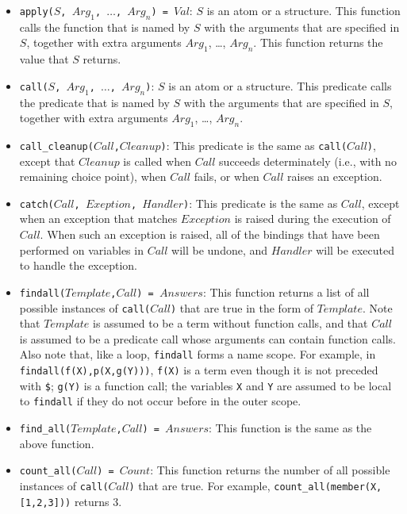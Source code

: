 \begin{itemize}
\item \texttt{apply($S$, $Arg_1$, $\ldots$, $Arg_n$) = $Val$}:   $S$ is an atom or a structure.  This function calls the function that is named by $S$ with the arguments that are specified in $S$, together with extra arguments $Arg_1$, \ldots, $Arg_n$.  This function returns the value that $S$ returns.
\item \texttt{call($S$, $Arg_1$, $\ldots$, $Arg_n$)}:  $S$ is an atom or a structure.  This predicate calls the predicate that is named by $S$ with the arguments that are specified in $S$, together with extra arguments $Arg_1$, \ldots, $Arg_n$.
\item \texttt{call\_cleanup($Call$,$Cleanup$)}: This predicate is the same as \texttt{call($Call$)}, except that \texttt{$Cleanup$} is called when \texttt{$Call$} succeeds determinately (i.e., with no remaining choice point), when \texttt{$Call$} fails, or when \texttt{$Call$} raises an exception.
\item \texttt{catch($Call$, $Exeption$, $Handler$)}: This predicate is the same as $Call$, except when an exception that matches $Exception$ is raised during the execution of $Call$. When such an exception is raised, all of the bindings that have been performed on variables in \texttt{$Call$} will be undone, and \texttt{$Handler$} will be executed to handle the exception. 
\item \texttt{findall($Template$,$Call$) = $Answers$}: This function returns a list of all possible instances of \texttt{call($Call$)} that are true in the form of $Template$. Note that $Template$ is assumed to be a term without function calls, and that $Call$ is assumed to be a predicate call whose arguments can contain function calls. Also note that, like a loop, \texttt{findall} forms a name scope. For example, in \texttt{findall(f(X),p(X,g(Y)))}, \texttt{f(X)} is a term even though it is not preceded with \verb+$+; \texttt{g(Y)} is a function call; the variables \texttt{X} and \texttt{Y} are assumed to be local to \texttt{findall} if they do not occur before in the outer scope.
\item \texttt{find\_all($Template$,$Call$) = $Answers$}: This function is the same as the above function.
\item \texttt{count\_all($Call$) = $Count$}: This function returns the number of all possible instances of \texttt{call($Call$)} that are true. For example, \texttt{count\_all(member(X,[1,2,3]))} returns 3.

\end{itemize}
